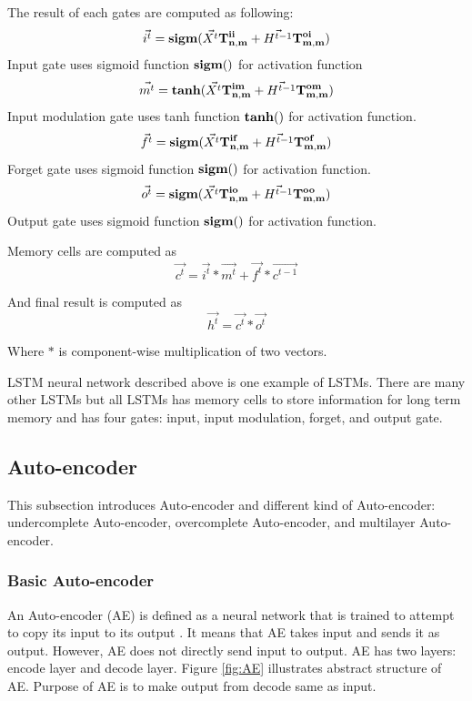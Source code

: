 \documentclass[draft,dvipsnames]{drexel-thesis}
\begin{document}
\begin{thesis}
\begin{enumerate}
	The result of each gates are computed as following:
	$$\vec{i^t} = \bold{sigm}(\vec{X^t}\bold{T_{n,m}^{ii}} + \vec{H^{t-1}}\bold{T_{m,m}^{oi}})$$
	Input gate uses sigmoid function $\bold{sigm()}$ for activation function
	$$\vec{m^t} = \bold{tanh}(\vec{X^t}\bold{T_{n,m}^{im}} + \vec{H^{t-1}}\bold{T_{m,m}^{om}})$$
	Input modulation gate uses tanh function $\bold{tanh()}$ for activation function.
	$$\vec{f^t} = \bold{sigm}(\vec{X^t}\bold{T_{n,m}^{if}} + \vec{H^{t-1}}\bold{T_{m,m}^{of}})$$
	Forget gate uses sigmoid function $\bold{sigm()}$ for activation function.
	$$\vec{o^t} = \bold{sigm}(\vec{X^t}\bold{T_{n,m}^{io}} + \vec{H^{t-1}}\bold{T_{m,m}^{oo}})$$
	Output gate uses sigmoid function $\bold{sigm()}$ for activation function.

	Memory cells are computed as
	$$\vec{c^t} = \vec{i^t} * \vec{m^t} + \vec{f^t} * \vec{c^{t-1}}$$
		
	And final result is computed as
	$$\vec{h^t} = \vec{c^t} * \vec{o^t}$$
		
	Where $*$ is component-wise multiplication of two vectors.
\end{enumerate}
	
	LSTM neural network described above is one example of LSTMs. There are many other LSTMs but all LSTMs has memory cells to store information for long term memory and has four gates: input, input modulation, forget, and output gate.



\subsection{Auto-encoder}\label{subsec:AE}

This subsection introduces Auto-encoder and different kind of Auto-encoder: undercomplete Auto-encoder, overcomplete Auto-encoder, and multilayer Auto-encoder.


\subsubsection{Basic Auto-encoder}\label{subsubsec:BAE}
An Auto-encoder (AE) is defined as a neural network that is trained to attempt to copy its input to its output \cite{Goodfellow-et-al-2016}. It means that AE takes input and sends it as output. However, AE does not directly send input to output. AE has two layers: encode layer and decode layer. Figure \ref{fig:AE} illustrates abstract structure of AE. Purpose of AE is to make output from decode same as input.


\end{thesis}
\end{document}
